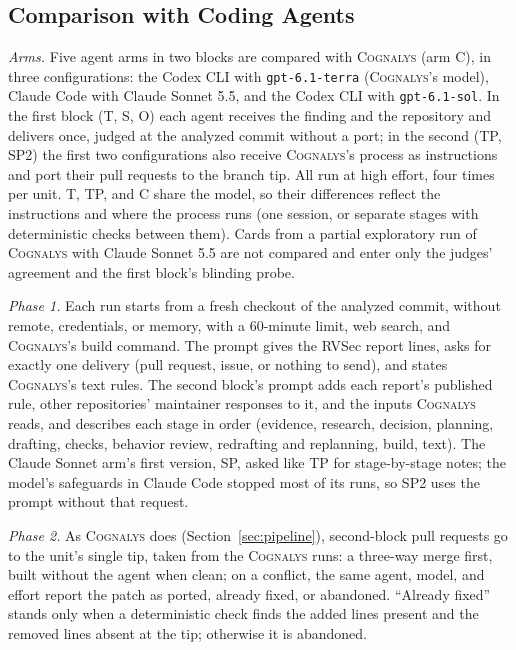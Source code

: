 \documentclass[conference]{IEEEtran}
\newcommand{\system}{\textsc{Cognalys}}
\begin{document}
\subsection{Comparison with Coding Agents}
\label{subsec:protocol}

\emph{Arms.} Five agent arms in two blocks are compared with {\system} (arm
C), in three configurations: the Codex CLI with \texttt{gpt-6.1-terra}
({\system}'s model), Claude Code with Claude Sonnet 5.5, and the Codex CLI
with \texttt{gpt-6.1-sol}. In the first block (T, S, O) each agent receives
the finding and the repository and delivers once, judged at the analyzed
commit without a port; in the second (TP, SP2) the first two configurations
also receive {\system}'s process as instructions and port their pull requests
to the branch tip. All run at high effort, four times per unit. T, TP, and C
share the model, so their differences reflect the instructions and where the
process runs (one session, or separate stages with deterministic checks
between them). Cards from a partial exploratory run of {\system} with Claude
Sonnet 5.5 are not compared and enter only the judges' agreement and the first
block's blinding probe.

\emph{Phase 1.} Each run starts from a fresh checkout of the analyzed commit,
without remote, credentials, or memory, with a 60-minute limit, web search,
and {\system}'s build command. The prompt gives the RVSec report lines, asks
for exactly one delivery (pull request, issue, or nothing to send), and states
{\system}'s text rules. The second block's prompt adds each report's published
rule, other repositories' maintainer responses to it, and the inputs {\system}
reads, and describes each stage in order (evidence, research, decision,
planning, drafting, checks, behavior review, redrafting and replanning, build,
text). The Claude Sonnet arm's first version, SP, asked like TP for
stage-by-stage notes; the model's safeguards in Claude Code stopped most of its
runs, so SP2 uses the prompt without that request.

\emph{Phase 2.} As {\system} does (Section~\ref{sec:pipeline}), second-block
pull requests go to the unit's single tip, taken from the {\system} runs: a
three-way merge first, built without the agent when clean; on a conflict, the
same agent, model, and effort report the patch as ported, already fixed, or
abandoned. ``Already fixed'' stands only when a deterministic check finds the
added lines present and the removed lines absent at the tip; otherwise it is
abandoned.
\end{document}

